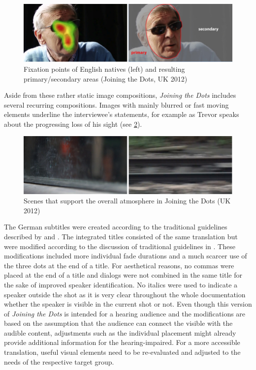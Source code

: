 \documentclass[output=paper]{langsci/langscibook}
\begin{document}
\begin{figure}
 \includegraphics[width=\textwidth]{figures/Fox3.png}
 \caption{Fixation points of English natives (left) and resulting primary/secondary areas (Joining the Dots, UK 2012)}
 \label{fox:fig:3}
\end{figure}  



Aside from these rather static image compositions, \textit{Joining the Dots} includes several recurring compositions. Images with mainly blurred or fast moving elements underline the interviewee’s statements, for example as Trevor speaks about the progressing loss of his sight (see \ref{fox:fig:4}).


\begin{figure}
 \includegraphics[width=\textwidth]{figures/Fox4.png}
 \caption{Scenes that support the overall atmosphere in Joining the Dots (UK 2012)}
 \label{fox:fig:4}
\end{figure} 



The German subtitles were created according to the traditional guidelines described by \citet{ivarsson1998} and \citet{karamitroglou1998}. The integrated titles consisted of the same translation but were modified according to the discussion of traditional guidelines in \citet{fox2012}. These modifications included more individual fade durations and a much scarcer use of the three dots at the end of a title. For aesthetical reasons, no commas were placed at the end of a title and dialogs were not combined in the same title for the sake of improved speaker identification. No italics were used to indicate a speaker outside the shot as it is very clear throughout the whole documentation whether the speaker is visible in the current shot or not. Even though this version of \textit{Joining the Dots }is intended for a hearing audience and the modifications are based on the assumption that the audience can connect the visible with the audible content, adjustments such as the individual placement might already provide additional information for the hearing-impaired. For a more accessible translation, useful visual elements need to be re-evaluated and adjusted to the needs of the respective target group.
\end{document}
